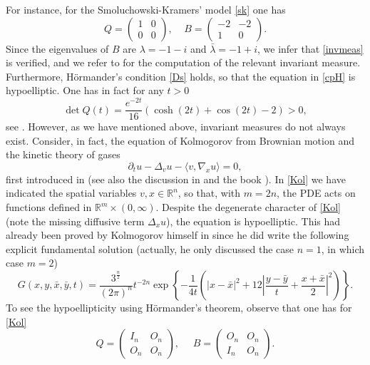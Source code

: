 \documentclass[11pt,a4paper]{amsart}
\newcommand{\Rn}{\mathbb R^n}
\newcommand{\Rm}{\mathbb R^m}
\newcommand{\p}{\partial}
\newcommand{\la}{\lambda}
\numberwithin{equation}{section}
\newcommand{\I}{\mathscr I_{HL}}
\newcommand{\sa}{\langle}
\newcommand{\da}{\rangle}
\numberwithin{equation}{section}
\begin{document}
For instance, for the Smoluchowski-Kramers' model \eqref{sk} one has
\begin{equation}\label{skeigenv}
Q = \begin{pmatrix} 1 & 0\\ 0& 0\end{pmatrix},\ \ \ \ \  B = \begin{pmatrix} -2 & -2\\ 1 & 0\end{pmatrix}.
\end{equation} 
Since the eigenvalues of $B$ are $\la = -1-i$ and $\bar \la = -1+i$, we infer that \eqref{invmeas} is verified, and we refer to \cite[Sec. 5]{FL} for the computation of the relevant invariant measure. Furthermore, H\"ormander's condition \eqref{Ds} holds, so that the equation  in \eqref{cpH} is hypoelliptic. One has in fact for any $t>0$
\[
\operatorname{det} Q(t) = \frac{e^{-2t}}{16} \left(\cosh(2t) + \cos(2t) - 2\right) > 0,
\]
see \cite[Sec. 3.1]{GTmathann}.  However, as we have mentioned above, invariant measures do not always exist. Consider, in fact, the equation of Kolmogorov from Brownian motion and the kinetic theory of gases
\begin{equation}\label{Kol}
\p_t u- \Delta_v u - \sa v,\nabla_x u\da = 0,
\end{equation}
first introduced in \cite{Kol} (see also the discussion in \cite{Strex} and the book \cite[Sec. 7.4]{Str}). In \eqref{Kol} we have indicated the spatial variables $v, x\in \Rn$, so that, with $m = 2n$, the PDE acts on functions defined in $\Rm\times (0,\infty)$. Despite the degenerate character of \eqref{Kol} (note the missing diffusive term $\Delta_x u$), the equation is hypoelliptic. This had already been proved by Kolmogorov himself in \cite{Kol} since he did write the following explicit fundamental solution (actually, he only discussed the case $n=1$, in which case $m=2$)
\[
G(x,y,\bar x,\bar y,t) = \frac{3^{\frac n2}}{(2\pi)^n} t^{-2n} \exp\left\{-\frac{1}{4t}\left(|x-\bar x|^2 + 12 |\frac{y-\bar y}t + \frac{x+\bar x}{2}|^2\right)\right\}.
\]
To see the hypoellipticity using H\"ormander's theorem, observe that one has for \eqref{Kol} 
\begin{equation}\label{QBkolmo}
Q = \begin{pmatrix} I_n & O_n\\ O_n & O_n\end{pmatrix},\ \ \ \ \ \  B = \begin{pmatrix} O_n & O_n\\I_n & O_n\end{pmatrix}.
\end{equation}
\end{document}
